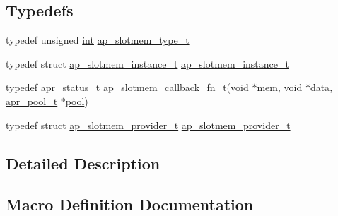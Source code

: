 \subsection*{Typedefs}
\begin{DoxyCompactItemize}
\item 
typedef unsigned \hyperlink{pcre_8txt_a42dfa4ff673c82d8efe7144098fbc198}{int} \hyperlink{group__MEM_ga2e647f79e68a1f0e6e733ec197c03bcc}{ap\+\_\+slotmem\+\_\+type\+\_\+t}
\item 
typedef struct \hyperlink{structap__slotmem__instance__t}{ap\+\_\+slotmem\+\_\+instance\+\_\+t} \hyperlink{group__MEM_ga147d819e6ccc39524beb178e41f783f7}{ap\+\_\+slotmem\+\_\+instance\+\_\+t}
\item 
typedef \hyperlink{group__apr__errno_gaa5105fa83cc322f09382292db8b47593}{apr\+\_\+status\+\_\+t} \hyperlink{group__MEM_gafbda0dd8b28735f3b902250213c3c506}{ap\+\_\+slotmem\+\_\+callback\+\_\+fn\+\_\+t}(\hyperlink{group__MOD__ISAPI_gacd6cdbf73df3d9eed42fa493d9b621a6}{void} $\ast$\hyperlink{group__apr__skiplist_ga5f00e9b1b039412bb144bae39e66b97a}{mem}, \hyperlink{group__MOD__ISAPI_gacd6cdbf73df3d9eed42fa493d9b621a6}{void} $\ast$\hyperlink{structdata}{data}, \hyperlink{structapr__pool__t}{apr\+\_\+pool\+\_\+t} $\ast$\hyperlink{group__APR__XLATE_gabb3cd978f04c73d0b763c391e9bfde73}{pool})
\item 
typedef struct \hyperlink{structap__slotmem__provider__t}{ap\+\_\+slotmem\+\_\+provider\+\_\+t} \hyperlink{group__MEM_gab71c09e37763a1e7b0a8dd6844ab8f10}{ap\+\_\+slotmem\+\_\+provider\+\_\+t}
\end{DoxyCompactItemize}


\subsection{Detailed Description}


\subsection{Macro Definition Documentation}

